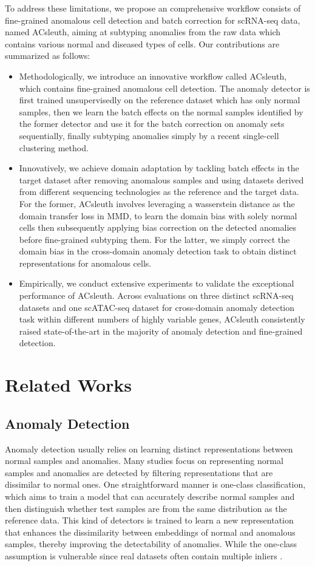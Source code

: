 \documentclass{article}
\begin{document}
To address these limitations, we propose an comprehensive workflow consists of fine-grained anomalous cell 
detection and batch correction for scRNA-seq data, named ACsleuth, aiming at 
subtyping anomalies from the raw data which contains various normal and diseased types of 
cells. Our contributions are summarized as follows:
\begin{itemize}

\item Methodologically, we introduce an innovative workflow called ACsleuth, which contains 
fine-grained anomalous cell detection. The anomaly detector is first trained 
unsupervisedly on the reference dataset which has only normal samples, then we learn 
the batch effects on the normal samples identified by the former detector and use it for 
the batch correction on anomaly sets sequentially, finally subtyping anomalies simply by a recent 
single-cell clustering method.
\item Innovatively, we achieve domain adaptation by tackling batch effects in the target dataset 
after removing anomalous samples and using datasets derived from different sequencing technologies 
as the reference and the target data. For the former, ACsleuth involves leveraging a wasserstein 
distance as the domain transfer loss in MMD, to learn the domain bias with solely normal cells 
then subsequently applying bias correction on the detected anomalies before fine-grained subtyping them. 
For the latter, we simply correct the domain bias in the cross-domain anomaly detection task to obtain 
distinct representations for anomalous cells.
\item Empirically, we conduct extensive experiments to validate the exceptional performance 
of ACsleuth. Across evaluations on three distinct scRNA-seq datasets and one scATAC-seq dataset 
for cross-domain anomaly detection task within different numbers of highly variable genes, 
ACsleuth consistently raised state-of-the-art in the majority of anomaly detection and 
fine-grained detection.
\end{itemize}


\section{Related Works}
\subsection{Anomaly Detection}
Anomaly detection usually relies on learning distinct representations between normal 
samples and anomalies. Many studies focus on representing normal samples and 
anomalies are detected by filtering representations that are dissimilar to normal ones. 
One straightforward manner is one-class classification, which aims to train a model that 
can accurately describe normal samples and then distinguish whether test samples are from 
the same distribution as the reference data. This kind of detectors is trained to learn a 
new representation \cite{RCA,liznerski} that 
enhances the dissimilarity between embeddings of normal and anomalous samples, thereby 
improving the detectability of anomalies. While the one-class assumption is vulnerable 
since real datasets often contain multiple inliers \cite{SLAD}.
\end{document}
